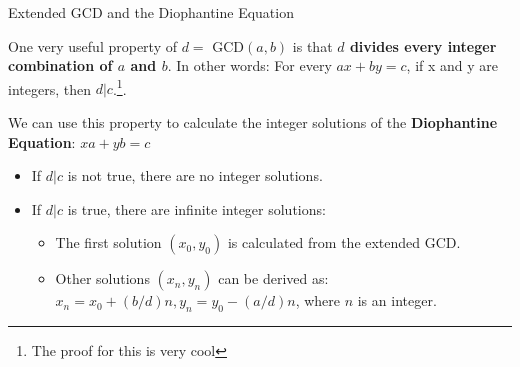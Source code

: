 \begin{frame}{Extended GCD and the Diophantine Equation}

  One very useful property of $d =$ GCD$(a,b)$ is that {\bf $d$ divides every integer combination of $a$ and $b$}. In other words: For every $ax+by = c$, if x and y are integers, then $d|c$.\footnote{The proof for this is very cool}.\bigskip

  We can use this property to calculate the integer solutions of the {\bf Diophantine Equation}: $xa+yb = c$\bigskip

  \begin{itemize}
    \item If $d|c$ is not true, there are no integer solutions.
    \item If $d|c$ is true, there are infinite integer solutions:
    \begin{itemize}
      \item The first solution $(x_0, y_0)$ is calculated from the extended GCD.
      \item Other solutions $(x_n,y_n)$ can be derived as: $x_n = x_0 + (b/d)n, y_n = y_0 - (a/d)n$, where $n$ is an integer.
    \end{itemize}
  \end{itemize}

\end{frame}

